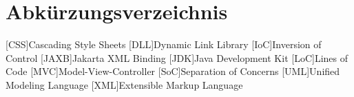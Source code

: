 \chapter*{Abkürzungsverzeichnis}
\label{abkürzungsverzeichnis}

\begin{acronym}
	[CSS]{Cascading Style Sheets}
	[DLL]{Dynamic Link Library}
	[IoC]{Inversion of Control}
	[JAXB]{Jakarta XML Binding}
	[JDK]{Java Development Kit}
	[LoC]{Lines of Code}
	[MVC]{Model-View-Controller}
	[SoC]{Separation of Concerns}
	[UML]{Unified Modeling Language}
	[XML]{Extensible Markup Language}
\end{acronym}

